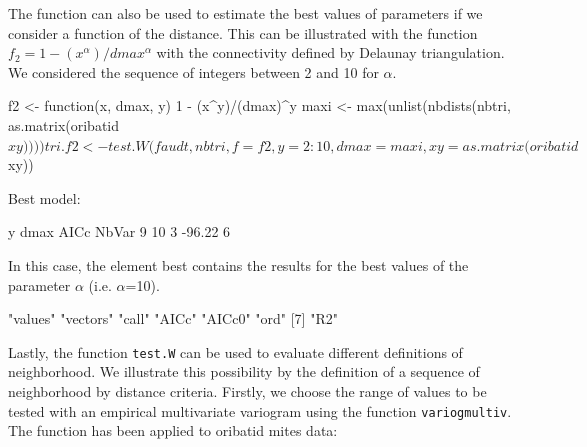 \documentclass[a4paper]{article}
\begin{document}
The function can also be used to estimate the best values of parameters if we consider a function of the distance.
This can be illustrated with the function $f_2=1-(x^\alpha)/dmax^\alpha$ with the connectivity defined by Delaunay triangulation. We considered the sequence of integers between 2 and 10 for $\alpha$.
\begin{Schunk}
\begin{Sinput}
 f2 <- function(x, dmax, y) {
     1 - (x^y)/(dmax)^y
 }
 maxi <- max(unlist(nbdists(nbtri, as.matrix(oribatid$xy))))
 tri.f2 <- test.W(faudt, nbtri, f = f2, y = 2:10, dmax = maxi, 
     xy = as.matrix(oribatid$xy))
\end{Sinput}
\begin{Soutput}
Best model:


   y dmax   AICc NbVar
9 10    3 -96.22     6
\end{Soutput}
\end{Schunk}
In this case, the element best contains the results for the best values of the parameter $\alpha$ (i.e. $\alpha$=10).
\begin{Schunk}
\begin{Soutput}
[1] "values"  "vectors" "call"    "AICc"    "AICc0"   "ord"    
[7] "R2"     
\end{Soutput}
\end{Schunk}
Lastly, the function \texttt{test.W} can be used to evaluate different definitions of neighborhood. We illustrate this possibility by the definition of a sequence of neighborhood by distance criteria.
Firstly, we choose the range of values to be tested with an empirical multivariate variogram using the function \texttt{variogmultiv}.
The function has been applied to oribatid mites data:
\end{document}
